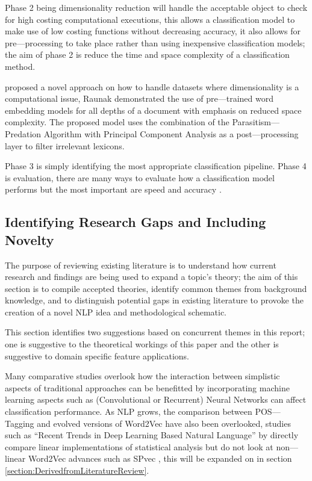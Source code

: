 Phase 2 being dimensionality reduction will handle the acceptable object to check for high costing computational executions, this allows a classification model to make use of low costing functions without decreasing accuracy, it also allows for pre---processing to take place rather than using inexpensive classification models; the aim of phase 2 is reduce the time and space complexity of a classification method.

\textcite{raunak2019effective} proposed a novel approach on how to handle datasets where dimensionality is a computational issue, Raunak demonstrated the use of pre---trained word embedding models for all depths of a document with emphasis on reduced space complexity. The proposed model uses the combination of the Parasitism---Predation Algorithm with Principal Component Analysis as a post---processing layer to filter irrelevant lexicons.

Phase 3 is simply identifying the most appropriate classification pipeline. Phase 4 is evaluation, there are many ways to evaluate how a classification model performs but the most important are speed and accuracy \textcite{kowsari2019text}.

\subsection{Identifying Research Gaps and Including Novelty} \label{section:IdentifyingResearchGapsandIncludingNovelty}

The purpose of reviewing existing literature is to understand how current research and findings are being used to expand a topic’s theory; the aim of this section is to compile accepted theories, identify common themes from background knowledge, and to distinguish potential gaps in existing literature to provoke the creation of a novel NLP idea and methodological schematic.

This section identifies two suggestions based on concurrent themes in this report; one is suggestive to the theoretical workings of this paper and the other is suggestive to domain specific feature applications.

Many comparative studies overlook how the interaction between simplistic aspects of traditional approaches can be benefitted by incorporating machine learning aspects such as (Convolutional or Recurrent) Neural Networks can affect classification performance. As NLP grows, the comparison between POS---Tagging and evolved versions of Word2Vec have also been overlooked, studies such as “Recent Trends in Deep Learning Based Natural Language” by \parencite{young2018recent} directly compare linear implementations of statistical analysis but do not look at non---linear Word2Vec advances such as SPvec \parencite{zhang2020spvec}, this will be expanded on in section \ref{section:DerivedfromLiteratureReview}.

